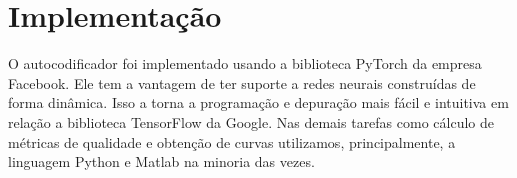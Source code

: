 \section{Implementação}
O autocodificador foi implementado usando a biblioteca PyTorch da empresa Facebook.  Ele tem a vantagem de ter suporte a redes neurais construídas de forma dinâmica. Isso a torna a programação e depuração mais fácil e intuitiva em relação a biblioteca TensorFlow da Google. 
Nas demais tarefas como cálculo de métricas de qualidade e obtenção de curvas utilizamos, principalmente, a linguagem Python e Matlab na minoria das vezes.  
